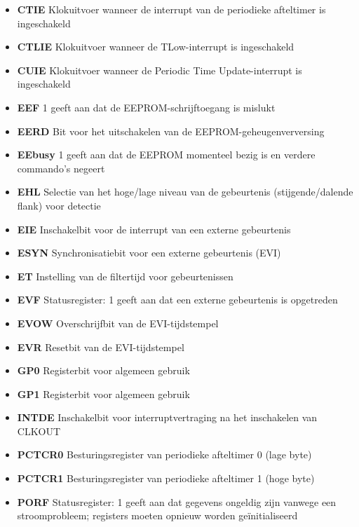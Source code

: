 \begin{itemize}
\item{\bf{CTIE}} Klokuitvoer wanneer de interrupt van de periodieke afteltimer is ingeschakeld
\item{\bf{CTLIE}} Klokuitvoer wanneer de TLow-interrupt is ingeschakeld
\item{\bf{CUIE}} Klokuitvoer wanneer de Periodic Time Update-interrupt is ingeschakeld
\item{\bf{EEF}} 1 geeft aan dat de EEPROM-schrijftoegang is mislukt
\item{\bf{EERD}} Bit voor het uitschakelen van de EEPROM-geheugenverversing
\item{\bf{EEbusy}} 1 geeft aan dat de EEPROM momenteel bezig is en verdere commando's negeert
\item{\bf{EHL}} Selectie van het hoge/lage niveau van de gebeurtenis (stijgende/dalende flank) voor detectie
\item{\bf{EIE}} Inschakelbit voor de interrupt van een externe gebeurtenis
\item{\bf{ESYN}} Synchronisatiebit voor een externe gebeurtenis (EVI)
\item{\bf{ET}} Instelling van de filtertijd voor gebeurtenissen
\item{\bf{EVF}} Statusregister: 1 geeft aan dat een externe gebeurtenis is opgetreden
\item{\bf{EVOW}} Overschrijfbit van de EVI-tijdstempel
\item{\bf{EVR}} Resetbit van de EVI-tijdstempel
\item{\bf{GP0}} Registerbit voor algemeen gebruik
\item{\bf{GP1}} Registerbit voor algemeen gebruik
\item{\bf{INTDE}} Inschakelbit voor interruptvertraging na het inschakelen van CLKOUT
\item{\bf{PCTCR0}} Besturingsregister van periodieke afteltimer 0 (lage byte)
\item{\bf{PCTCR1}} Besturingsregister van periodieke afteltimer 1 (hoge byte)
\item{\bf{PORF}} Statusregister: 1 geeft aan dat gegevens ongeldig zijn vanwege een stroomprobleem; registers moeten opnieuw worden geïnitialiseerd

\end{itemize}
